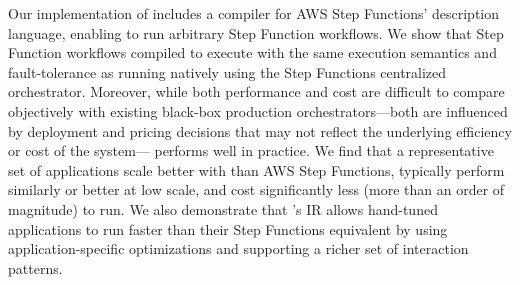 Our implementation of \name{} includes a compiler for AWS Step Functions'
description language, enabling \name{} to run arbitrary Step Function workflows.
We show that Step Function workflows compiled to \name{} execute with the same
execution semantics and fault-tolerance as running natively using the Step
Functions centralized orchestrator.  Moreover, while both performance and cost
are difficult to compare objectively with existing black-box production
orchestrators---both are influenced by deployment and pricing decisions that may
not reflect the underlying efficiency or cost of the system---\name{} performs
well in practice. We find that a representative set of applications scale better
with \name{} than AWS Step Functions, typically perform similarly or better at
low scale, and cost significantly less (more than an order of magnitude) to run.
We also demonstrate that \name{}'s IR allows hand-tuned applications to run
faster than their Step Functions equivalent by using application-specific
optimizations and supporting a richer set of interaction patterns.





